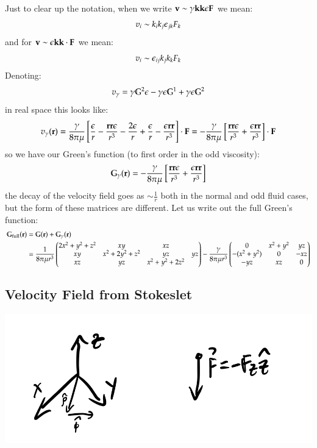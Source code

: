 Just to clear up the notation, when we write $\mathbf{v} \sim \gamma \mathbf{k}\mathbf{k}\epsilon\mathbf{F}$ we mean:
\begin{equation}
    v_i \sim k_ik_j\epsilon_{jk}F_k
\end{equation}
and for $\mathbf{v} \sim \epsilon\mathbf{k}\mathbf{k} \cdot \mathbf{F}$ we mean:
\begin{equation}
    v_i \sim \epsilon_{ij}k_jk_kF_k
\end{equation}
Denoting:
\begin{equation}
    v_\gamma = \gamma \mathbb{G}^2 \epsilon - \gamma \epsilon \mathbb{G}^1 + \gamma \epsilon \mathbb{G}^2
\end{equation}
in real space this looks like:
\begin{equation}
    v_\gamma(\mathbf{r}) = \frac{\gamma}{8\pi\mu}\left[\frac{\epsilon}{r} - \frac{\mathbf{r}\mathbf{r}\epsilon}{r^3} - \frac{2\epsilon}{r} + \frac{\epsilon}{r} - \frac{\epsilon\mathbf{r}\mathbf{r}}{r^3}\right]\cdot\mathbf{F} = -\frac{\gamma}{8\pi\mu}\left[\frac{\mathbf{r}\mathbf{r}\epsilon}{r^3} + \frac{\epsilon\mathbf{r}\mathbf{r}}{r^3}\right]\cdot\mathbf{F}
\end{equation}
so we have our Green's function (to first order in the odd viscosity):
\begin{equation}
    \mathbb{G}_\gamma(\mathbf{r}) = -\frac{\gamma}{8\pi\mu}\left[\frac{\mathbf{r}\mathbf{r}\epsilon}{r^3} + \frac{\epsilon\mathbf{r}\mathbf{r}}{r^3}\right]
\end{equation}
the decay of the velocity field goes as $\sim \frac{1}{r}$ both in the normal and odd fluid cases, but the form of these matrices are different. Let us write out the full Green's function:
\begin{equation}
    \begin{split}
        \mathbb{G}_{\text{full}}(\mathbf{r}) &= \mathbb{G}(\mathbf{r}) + \mathbb{G}_\gamma(\mathbf{r}) 
        \\ &= \frac{1}{8\pi \mu r^3}\begin{pmatrix}2x^2 + y^2 + z^2 & xy & xz \\ xy & x^2 + 2y^2 + z^2 & yz & yz \\ xz & yz & x^2 + y^2 + 2z^2\end{pmatrix} - \frac{\gamma}{8\pi\mu r^3}\begin{pmatrix}0 & x^2 + y^2 & yz \\ -(x^2 + y^2) & 0 & -xz \\ -yz & xz & 0\end{pmatrix}
    \end{split}
\end{equation}

\subsection{Velocity Field from Stokeslet}

\begin{center}
    \includegraphics[scale=0.35]{Lectures/Images/lec12-coordinates.png}
\end{center}

